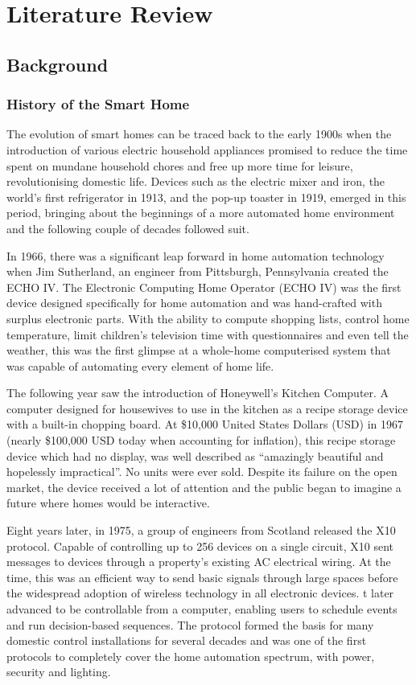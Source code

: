 \chapter{Literature Review}\label{ch:lit_review}

\section{Background}

\subsection{History of the Smart Home}
The evolution of smart homes can be traced back to the early 1900s when the introduction of various electric household appliances promised to reduce the time spent on mundane household chores and free up more time for leisure, revolutionising domestic life.
Devices such as the electric mixer and iron, the world's first refrigerator in 1913, and the pop-up toaster in 1919, emerged in this period, bringing about the beginnings of a more automated home environment and the following couple of decades followed suit.

In 1966, there was a significant leap forward in home automation technology when Jim Sutherland, an engineer from Pittsburgh, Pennsylvania created the ECHO IV.
The Electronic Computing Home Operator (ECHO IV) was the first device designed specifically for home automation and was hand-crafted with surplus electronic parts.
With the ability to compute shopping lists, control home temperature, limit children's television time with questionnaires and even tell the weather, this was the first glimpse at a whole-home computerised system that was capable of automating every element of home life.

The following year saw the introduction of Honeywell's Kitchen Computer.
A computer designed for housewives to use in the kitchen as a recipe storage device with a built-in chopping board.
At \$10,000 United States Dollars (USD) in 1967 (nearly \$100,000 USD today when accounting for inflation), this recipe storage device which had no display, was well described as ``amazingly beautiful and hopelessly impractical''.
No units were ever sold.
Despite its failure on the open market, the device received a lot of attention and the public began to imagine a future where homes would be interactive.

Eight years later, in 1975, a group of engineers from Scotland released the X10 protocol.
Capable of controlling up to 256 devices on a single circuit, X10 sent messages to devices through a property's existing AC electrical wiring.
At the time, this was an efficient way to send basic signals through large spaces before the widespread adoption of wireless technology in all electronic devices.
t later advanced to be controllable from a computer, enabling users to schedule events and run decision-based sequences.
The protocol formed the basis for many domestic control installations for several decades and was one of the first protocols to completely cover the home automation spectrum, with power, security and lighting.

